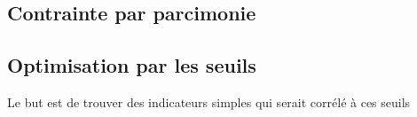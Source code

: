 \subsection{Contrainte par parcimonie}



\subsection{Optimisation par les seuils}



Le but est de trouver des indicateurs simples qui serait corrélé à ces seuils


%